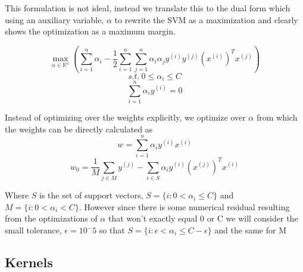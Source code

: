 \documentclass[10pt,twocolumn]{article}
\begin{document}
    
This formulation is not ideal, instead we translate this to the dual form which using an auxiliary variable, $\alpha$ to rewrite the SVM as a maximization and clearly shows the optimization as a maximum margin. 

\begin{equation}
\max_{\alpha \in \mathbb{R}^n} ( \sum_{i=1}^n \alpha_i - \frac{1}{2} \sum_{i=1}^n \sum_{j=1}^n \alpha_i \alpha_j y^{(i)} y^{(j)} (x^{(i)})^T x^{(j)})
\end{equation}
\begin{equation}
s.t. \: 0 \leq \alpha_i \leq C
\end{equation}
\begin{equation}
\sum_{i=1}^n \alpha_i y^{(i)} =0
\end{equation}

Instead of optimizing over the weights explicitly, we optimize over $\alpha$ from which the weights can be directly calculated as 
\begin{equation}
w= \sum_{i=1}^n \alpha_i y^{(i)}x^{(i)}
\end{equation}  
\begin{equation}
w_0= \frac{1}{M} \sum_{j \in M} y^{(j)} - \sum_{i \in S} \alpha_i y^{(i)}(x^{(j)})^Tx^{(i)}
\end{equation}

Where $S$ is the set of support vectors, $S=\{i : 0 < \alpha_i \leq C \}$ and $M = \{i : 0 < \alpha_i < C \}$. However since there is some numerical residual resulting from the optimizations of $\alpha$ that won't exactly equal 0 or C we will consider the small tolerance, $\epsilon= 10^-5$ so that  $S=\{i : \epsilon < \alpha_i \leq C-\epsilon \}$ and the same for M

\subsection*{Kernels}
      
\end{document}
